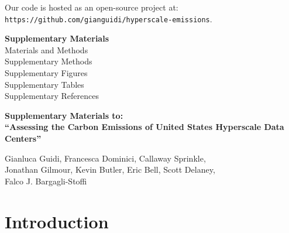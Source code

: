 \documentclass[12pt]{article}
\begin{document}
Our code is hosted as an open-source project at: \\ \texttt{https://github.com/gianguidi/hyperscale-emissions}.

\vspace{1cm}
\noindent \textbf{Supplementary Materials}\\
Materials and Methods\\
Supplementary Methods\\
Supplementary Figures\\
Supplementary Tables\\
Supplementary References\\
\pagebreak


%

\appendix

    \setcounter{page}{1}

\makeatletter
\def\@seccntformat#1{\@ifundefined{#1@cntformat}%
   {\csname the#1\endcsname\space}%
   {\csname #1@cntformat\endcsname}}%
\newcommand\section@cntformat{\thesection \space} %
\makeatother
\renewcommand{\thesection}{S.\arabic{section}}
    
\begin{center}
    \Large \textbf{Supplementary Materials to: \\
    ``Assessing the Carbon Emissions of United States Hyperscale Data Centers''}

    \vspace{0.25cm}
    \large Gianluca Guidi, Francesca Dominici, Callaway Sprinkle,\\ Jonathan Gilmour, Kevin Butler, Eric Bell, Scott Delaney,\\ Falco J. Bargagli-Stoffi
\end{center}


\doublespacing
\thispagestyle{empty}
\tableofcontents
\clearpage

\newpage

\setcounter{page}{1}

\section*{Introduction}
\end{document}
